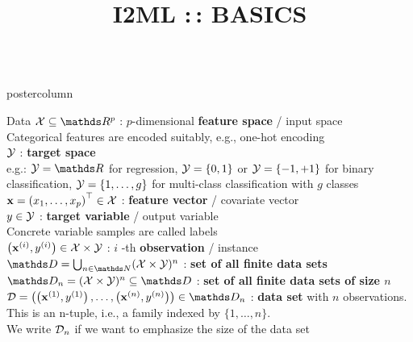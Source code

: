 \documentclass{beamer}
\title{I2ML :\,: BASICS} %
\newlength{\columnheight} %
\begin{document}
\begin{frame}[fragile]{}
\vspace{-8ex}
\begin{columns}
	\begin{column}{.31\textwidth}
		\begin{beamercolorbox}[center]{postercolumn}
			\begin{minipage}{.98\textwidth}
				\parbox[t][\columnheight]{\textwidth}{
\begin{myblock}{Data}
 $\Xspace \subseteq \R^p$ : $p$-dimensional \textbf{feature space} / input space\\ 
Categorical features are encoded suitably, e.g., one-hot encoding \\

$\mathcal{Y}$ : \textbf{target space} \\ 
e.g.: $\Yspace = \R$ for regression, $\mathcal{Y} = \{0, 1\}$ or $\mathcal{Y} = \{-1, +1\}$ for binary classification, $\mathcal{Y} = \{1, \ldots, g\}$ for multi-class classification with $g$ classes\\

$\mathbf{x} = \left(x_1, \ldots, x_p\right)^\top \in \mathcal{X}$ : \textbf{feature vector} / covariate vector\\ 
 
$y \in \mathcal{Y}$ : \textbf{target variable} / output variable \\
Concrete variable samples are called labels \\

$\left(\mathbf{x}^{(i)}, y^{(i)}\right) \in \mathcal{X}\times \mathcal{Y}$ : $i$ -th \textbf{observation} / instance \\

$\allDatasets = \defAllDatasets$ : \textbf{set of all finite data sets} \\

$\allDatasetsn = \defAllDatasetsn \subseteq \allDatasets$ : \textbf{set of all finite data sets of size $n$} \\

$\D = \Dset \in \allDatasetsn $ : \textbf{data set} with $n$ observations. 
This is an n-tuple, i.e., a family indexed by $\{1, \dots, n\}$. \\
We write $\mathcal{D}_n$ if we want to emphasize the size of the data set\\
 

\end{myblock}}
\end{minipage}
\end{beamercolorbox}
\end{column}
\end{columns}
\end{frame}
\end{document}
